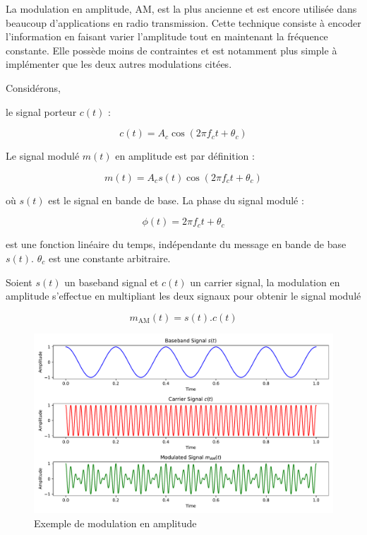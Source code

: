 La modulation en amplitude, \ac{AM}, est la plus ancienne et est encore utilisée dans beaucoup d'applications en radio transmission. Cette technique consiste à encoder l'information en faisant varier l'amplitude tout en maintenant la fréquence constante. Elle possède moins de contraintes et est notamment plus simple à implémenter que les deux autres modulations citées. 

\vspace{0.1cm}

Considérons,

le signal porteur $c(t)$ :

\begin{equation}\label{eq112}
c(t) = A_c \cos(2 \pi f_c t + \theta_c)
\end{equation}

Le signal modulé $m(t)$ en amplitude est par définition :

\begin{equation}\label{eq112}
m(t) = A_c s(t) \cos(2 \pi f_c t + \theta_c)
\end{equation}

où $s(t)$ est le signal en bande de base. La phase du signal modulé :

\begin{equation}\label{eq113}
\phi (t) = 2 \pi f_c t + \theta_c 
\end{equation}

est une fonction linéaire du temps, indépendante du message en bande de base $s(t)$. $\theta_c$ est une constante arbitraire.

\vspace{0.1cm}

Soient $s(t)$ un baseband signal et $c(t)$ un carrier signal, la modulation en amplitude s'effectue en multipliant les deux signaux pour obtenir le signal modulé 

\begin{equation}\label{eq2}
m_\mathrm{AM}(t) = s(t) . c(t)
\end{equation}

\newpage

\begin{figure}[h]
\centering

\includegraphics[scale=0.5]{images/AM_MOD.pdf}
\caption{Exemple de modulation en amplitude}\label{term1}
\end{figure}

